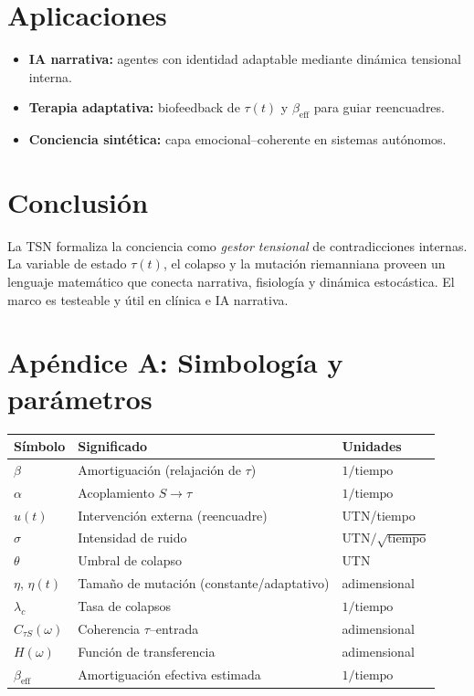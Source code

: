 \documentclass[10pt,a4paper,twocolumn]{article}
\theoremstyle{definition}
\theoremstyle{plain}
\begin{document}
\section{Aplicaciones}
\begin{itemize}[leftmargin=1em]
  \item \textbf{IA narrativa:} agentes con identidad adaptable mediante dinámica tensional interna.
  \item \textbf{Terapia adaptativa:} biofeedback de \(\tau(t)\) y \(\beta_{\mathrm{eff}}\) para guiar reencuadres.
  \item \textbf{Conciencia sintética:} capa emocional–coherente en sistemas autónomos.
\end{itemize}

\section{Conclusión}
La TSN formaliza la conciencia como \emph{gestor tensional} de contradicciones internas. La variable de estado \(\tau(t)\), el colapso y la mutación riemanniana proveen un lenguaje matemático que conecta narrativa, fisiología y dinámica estocástica. El marco es testeable y útil en clínica e IA narrativa.

\appendix
\section*{Apéndice A: Simbología y parámetros}
\renewcommand{\arraystretch}{1.0}
\begin{table}[H]\centering\small
\begin{tabular}{@{}p{2.6cm}p{8.8cm}p{2.2cm}@{}}
\toprule
\textbf{Símbolo} & \textbf{Significado} & \textbf{Unidades}\\ \midrule
$\beta$ & Amortiguación (relajación de $\tau$) & $1/\text{tiempo}$\\
$\alpha$ & Acoplamiento $S\to\tau$ & $1/\text{tiempo}$\\
$u(t)$ & Intervención externa (reencuadre) & UTN/tiempo\\
$\sigma$ & Intensidad de ruido & UTN$/\sqrt{\text{tiempo}}$\\
$\theta$ & Umbral de colapso & UTN\\
$\eta,\,\eta(t)$ & Tamaño de mutación (constante/adaptativo) & adimensional\\
$\lambda_c$ & Tasa de colapsos & $1/\text{tiempo}$\\
$C_{\tau S}(\omega)$ & Coherencia \(\tau\)–entrada & adimensional\\
$H(\omega)$ & Función de transferencia & adimensional\\
$\beta_{\mathrm{eff}}$ & Amortiguación efectiva estimada & $1/\text{tiempo}$\\
\bottomrule
\end{tabular}
\end{table}
\end{document}
